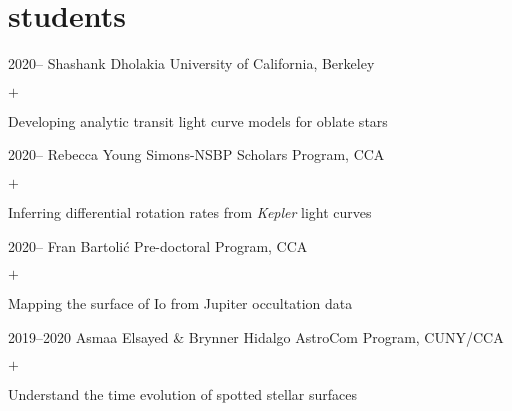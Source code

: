 \documentclass[]{luger-cv} %
\begin{document}


\ifdefined \withother

    \section{students}
    \begin{entrylist}


        \entry
        {2020--}
        {Shashank Dholakia}
        {University of California, Berkeley}
        {%
            \vspace{-1em}
            \begin{list}{$+$}{\cvlist}
                \item Developing analytic transit light curve models for oblate stars
            \end{list}
        }


        \entry
        {2020--}
        {Rebecca Young}
        {Simons-NSBP Scholars Program, CCA}
        {%
            \vspace{-1em}
            \begin{list}{$+$}{\cvlist}
                \item Inferring differential rotation rates from \emph{Kepler} light curves
            \end{list}
        }


        \entry
        {2020--}
        {Fran Bartoli\'c}
        {Pre-doctoral Program, CCA}
        {%
            \vspace{-1em}
            \begin{list}{$+$}{\cvlist}
                \item Mapping the surface of Io from Jupiter occultation data
            \end{list}
        }

        \entry
        {2019--2020}
        {Asmaa Elsayed \& Brynner Hidalgo}
        {AstroCom Program, CUNY/CCA}
        {%
            \vspace{-1em}
            \begin{list}{$+$}{\cvlist}
                \item Understand the time evolution of spotted stellar surfaces
            \end{list}
        }


\end{entrylist}
\end{document}
